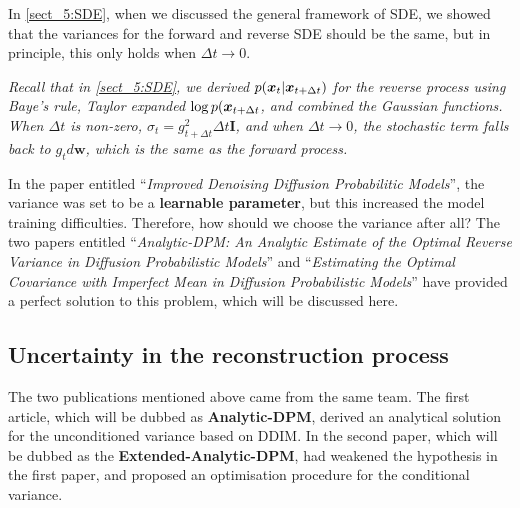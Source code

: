 In \cref{sect_5:SDE}, when we discussed the general framework of SDE, we showed that the variances for the forward and reverse SDE should be the same, but in principle, this only holds when $\Delta t\to 0$.
\begin{myquote}
\footnotesize{\textit{Recall that in \cref{sect_5:SDE}, we derived $p(\bm{x}_{t}|\bm{x}_{t+\Delta t})$ for the reverse process using Baye's rule, Taylor expanded $\log p(\bm{x}_{t+\Delta t}$, and combined the Gaussian functions. When $\Delta t$ is non-zero, $\sigma_t=g_{t+\Delta t}^2\Delta t\bm{I}$, and when $\Delta t\to 0$, the stochastic term falls back to $g_t d\bm{w}$, which is the same as the forward process.
}}

\end{myquote}


In the paper entitled ``\textit{Improved Denoising Diffusion Probabilitic Models}''\cite{nichol2021improved}, the variance was set to be a \textbf{learnable parameter}, but this increased the model training difficulties. Therefore, how should we choose the variance after all? The two papers entitled ``\textit{Analytic-DPM: An Analytic Estimate of the Optimal Reverse Variance in Diffusion Probabilistic Models}''\cite{bao2022analytic} and ``\textit{Estimating the Optimal Covariance with Imperfect Mean in Diffusion Probabilistic Models}''\cite{bao2022estimating} have provided a perfect solution to this problem, which will be discussed here.

\subsection{Uncertainty in the reconstruction process}
The two publications mentioned above came from the same team. The first article, which will be dubbed as \textbf{Analytic-DPM}, derived an analytical solution for the unconditioned variance based on DDIM. In the second paper, which will be dubbed as the \textbf{Extended-Analytic-DPM}, had weakened the hypothesis in the first paper, and proposed an optimisation procedure for the conditional variance. 

